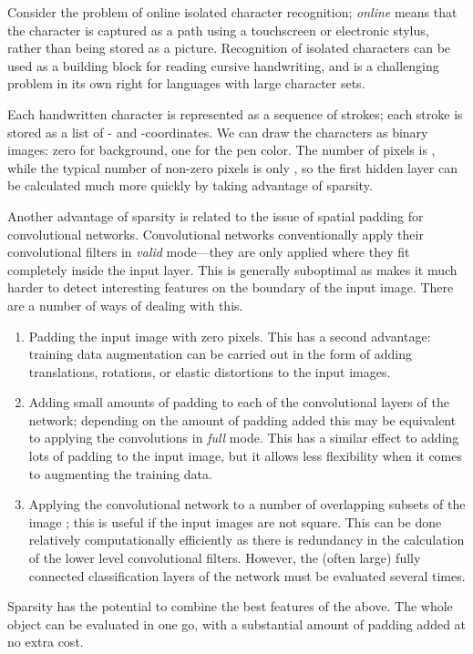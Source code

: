 \documentclass{article}
\numberwithin{equation}{subsection}
\newenvironment{circlist}{
  \begin{enumerate}[]
  \setlength{\itemsep}{0pt}
  \setlength{\parskip}{0pt}
  \setlength{\parsep}{0pt}
}{\end{enumerate}}
\begin{document}
Consider the problem of online isolated character recognition; {\em online} means that the character is captured as a path using a touchscreen or electronic stylus, rather than being stored as a picture. Recognition of isolated characters can be used as a building block for reading cursive handwriting, and is a challenging problem in its own right for languages with large character sets.

Each handwritten character is represented as a sequence of strokes; each stroke is stored as a list of - and -coordinates. We can draw the characters as  binary images: zero for background, one for the pen color. The number of pixels is , while the typical number of non-zero pixels is only , so the first hidden layer can be calculated  much more quickly by taking advantage of sparsity.

Another advantage of sparsity is related to the issue of spatial padding for convolutional networks. Convolutional networks conventionally apply their convolutional filters in {\em valid} mode---they are only applied where they fit completely inside the input layer. This is generally suboptimal as makes it much harder to detect interesting features on the boundary of the input image. There are a number of ways of dealing with this.
\begin{circlist}
\item Padding the input image \cite{multicolumndeep} with zero pixels. This has a second advantage: training data augmentation can be carried out in the form of adding translations, rotations, or elastic distortions to the input images.
\item Adding small amounts of padding to each of the convolutional layers of the network; depending on the amount of padding added this may be equivalent to applying the convolutions in {\em full} mode. This has a similar effect to adding lots of padding to the input image, but it allows less flexibility when it comes to augmenting the training data.
\item Applying the convolutional network to a number of overlapping subsets of the image \cite{conf/nips/KrizhevskySH12}; this is useful if the input images are not square. This can be done relatively computationally efficiently as there is redundancy in the calculation of the lower level convolutional filters. However, the (often large) fully connected classification layers of the network must be evaluated several times.
\end{circlist}
Sparsity has the potential to combine the best features of the above.
The whole object can be evaluated in one go, with a substantial amount of padding added at no extra cost.
\end{document}
